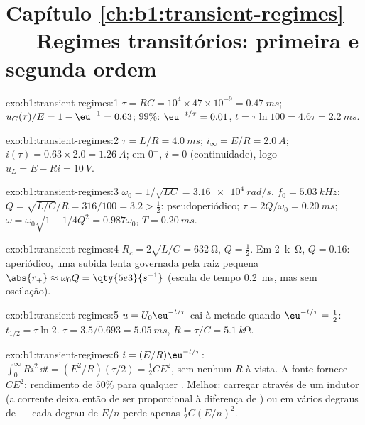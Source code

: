 \section*{Capítulo \ref{ch:b1:transient-regimes} --- Regimes transitórios: primeira e segunda ordem}

\begin{solution}{exo:b1:transient-regimes:1}
$\tau = RC = 10^4 \times 47\times10^{-9} = \qty{0.47}{ms}$; $u_C(\tau)/E
= 1 - \eu^{-1} = 0.63$; $99\%$: $\eu^{-t/\tau} = 0.01$, $t = \tau\ln 100
= 4.6\tau = \qty{2.2}{ms}$.
\end{solution}

\begin{solution}{exo:b1:transient-regimes:2}
$\tau = L/R = \qty{4.0}{ms}$; $i_\infty = E/R = \qty{2.0}{A}$; $i(\tau) =
0.63 \times 2.0 = \qty{1.26}{A}$; em $0^+$, $i = 0$ (continuidade), logo
$u_L = E - Ri = \qty{10}{V}$.
\end{solution}

\begin{solution}{exo:b1:transient-regimes:3}
$\omega_0 = 1/\sqrt{LC} = \qty{3.16e4}{rad/s}$, $f_0 = \qty{5.03}{kHz}$;
$Q = \sqrt{L/C}/R = 316/100 = 3.2 > \tfrac12$: pseudoperiódico;
$\tau = 2Q/\omega_0 = \qty{0.20}{ms}$; $\omega = \omega_0\sqrt{1 - 1/4Q^2}
= 0.987\omega_0$, $T = \qty{0.20}{ms}$.
\end{solution}

\begin{solution}{exo:b1:transient-regimes:4}
$R_c = 2\sqrt{L/C} = \qty{632}{\ohm}$, $Q = \tfrac12$. Em \qty{2}{k\ohm},
$Q = 0.16$: aperiódico, uma subida lenta governada pela raiz pequena
$\abs{r_+} \approx \omega_0 Q = \qty{5e3}{s^{-1}}$ (escala de tempo
\qty{0.2}{ms}, mas sem oscilação).
\end{solution}

\begin{solution}{exo:b1:transient-regimes:5}
$u = U_0\eu^{-t/\tau}$ cai à metade quando $\eu^{-t/\tau} = \tfrac12$: $t_{1/2}
= \tau\ln 2$. $\tau = 3.5/0.693 = \qty{5.05}{ms}$, $R = \tau/C =
\qty{5.1}{k\ohm}$.
\end{solution}

\begin{solution}{exo:b1:transient-regimes:6}
$i = (E/R)\eu^{-t/\tau}$: $\int_0^\infty Ri^2\,\dd t = (E^2/R)(\tau/2) =
\tfrac12 CE^2$, sem nenhum $R$ à vista. A fonte fornece $CE^2$: rendimento
de $50\%$ para qualquer . Melhor: carregar através de um indutor (a
corrente deixa então de ser proporcional à diferença de ) ou em vários
degraus de  --- cada degrau de $E/n$ perde apenas $\tfrac12 C(E/n)^2$.
\end{solution}

